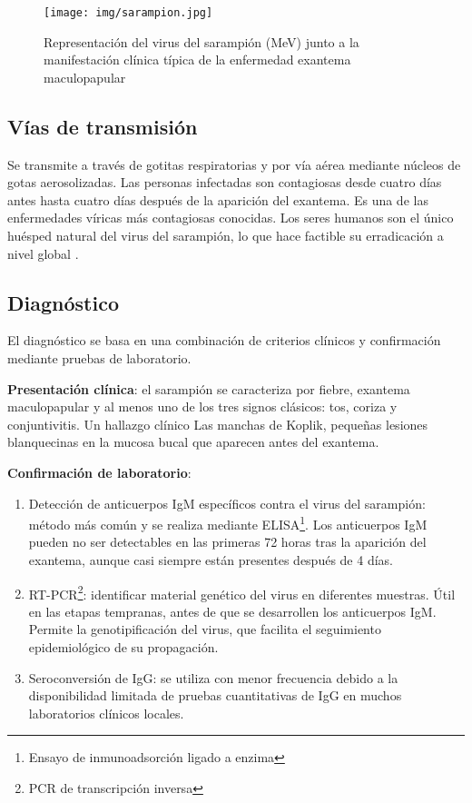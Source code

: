\begin{enumerate}
\begin{figure}[H]
        \centering
        \texttt{[image: img/sarampion.jpg]}
        \caption{Representación del virus del sarampión (MeV) junto a la manifestación clínica típica de la enfermedad exantema maculopapular}
        \label{fig:sarampión}
        \vspace{0.5cm} %
\end{figure}

\subsection{Vías de transmisión}
Se transmite a través de gotitas respiratorias y por vía aérea mediante núcleos de gotas aerosolizadas. Las personas infectadas son contagiosas desde cuatro días antes hasta cuatro días después de la aparición del exantema. Es una de las enfermedades víricas más contagiosas conocidas. Los seres humanos son el único huésped natural del virus del sarampión, lo que hace factible su erradicación a nivel global \cite{moss2017measles}.

\subsection{Diagnóstico}
El diagnóstico se basa \cite{baeten2012antiretroviral} en una combinación de criterios clínicos y confirmación mediante pruebas de laboratorio.

\textbf{Presentación clínica}: el sarampión se caracteriza por fiebre, exantema maculopapular y al menos uno de los tres signos clásicos: tos, coriza y conjuntivitis. Un hallazgo clínico Las manchas de Koplik, pequeñas lesiones blanquecinas en la mucosa bucal que aparecen antes del exantema.

\textbf{Confirmación de laboratorio}:
\begin{enumerate}
    \item Detección de anticuerpos IgM específicos contra el virus del sarampión: método más común y se realiza mediante ELISA\footnote{Ensayo de inmunoadsorción ligado a enzima}. Los anticuerpos IgM pueden no ser detectables en las primeras 72 horas tras la aparición del exantema, aunque casi siempre están presentes después de 4 días.
    \item RT-PCR\footnote{PCR de transcripción inversa}: identificar material genético del virus en diferentes muestras. Útil en las etapas tempranas, antes de que se desarrollen los anticuerpos IgM. Permite la genotipificación del virus, que facilita el seguimiento epidemiológico de su propagación.
    \item Seroconversión de IgG:  se utiliza con menor frecuencia debido a la disponibilidad limitada de pruebas cuantitativas de IgG en muchos laboratorios clínicos locales.
\end{enumerate}


\end{enumerate}
